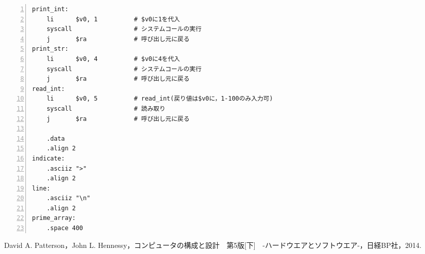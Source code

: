 \begin{Verbatim}[numbers=left, xleftmargin=10mm, numbersep=6pt,
                    fontsize=\small, baselinestretch=0.8]
print_int:
    li      $v0, 1          # $v0に1を代入
    syscall                 # システムコールの実行
    j       $ra             # 呼び出し元に戻る
print_str:
    li      $v0, 4          # $v0に4を代入
    syscall                 # システムコールの実行
    j       $ra             # 呼び出し元に戻る
read_int:
    li      $v0, 5          # read_int(戻り値は$v0に，1-100のみ入力可)
    syscall                 # 読み取り
    j       $ra             # 呼び出し元に戻る

    .data
    .align 2
indicate:
    .asciiz ">"
    .align 2
line:
    .asciiz "\n"
    .align 2
prime_array:
    .space 400
\end{Verbatim}

\begin{thebibliography}{99}
   David A. Patterson，John L. Hennessy，コンピュータの構成と設計　第5版[下]　-ハードウエアとソフトウエア-，日経BP社，2014.
\end{thebibliography}


